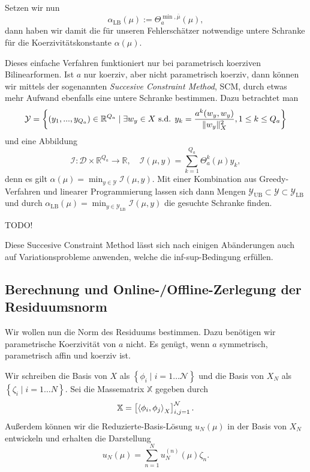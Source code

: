Setzen wir nun
\begin{equation}
    \alpha_\text{LB}(\mu) := \Theta_a^{\min, \bar \mu}(\mu),
\end{equation}
dann haben wir damit die für unseren Fehlerschätzer notwendige untere Schranke für die Koerzivitätskonstante $\alpha(\mu)$.

Dieses einfache Verfahren funktioniert nur bei parametrisch koerziven Bilinearformen. Ist $a$ nur koerziv, aber nicht parametrisch koerziv, dann können wir mittels der sogenannten \emph{Succesive Constraint Method}, SCM, durch etwas mehr Aufwand ebenfalls eine untere Schranke bestimmen. Dazu betrachtet man
\begin{equation}
    \mathcal Y = \left\{ (y_1, ..., y_{Q_a}) \in \mathbb{R}^{Q_a} \mid \exists w_y \in X \text{ s.d. } y_k = \frac{a^k(w_y, w_y)}{\lVert w_y\rVert^2_X}, 1 \leq k \leq Q_a \right\}
\end{equation}
und eine Abbildung
\begin{equation}
    \mathcal I \colon \mathcal D \times \mathbb{R}^{Q_a} \to \mathbb{R}, \quad \mathcal I(\mu, y) = \sum_{k=1}^{Q_a} \Theta^k_a(\mu) y_k,
\end{equation}
 denn es gilt $\alpha(\mu) = \min_{y \in \mathcal Y} \mathcal I(\mu, y)$.
Mit einer Kombination aus Greedy-Verfahren und linearer Programmierung lassen sich dann Mengen $\mathcal Y_\text{UB} \subset \mathcal Y \subset \mathcal Y_\text{LB}$ und durch $\alpha_\text{LB}(\mu) = \min_{y \in \mathcal Y_\text{LB}} \mathcal I(\mu, y)$ die gesuchte Schranke finden.

TODO!

Diese Succesive Constraint Method lässt sich nach einigen Abänderungen auch auf Variationsprobleme anwenden, welche die inf-sup-Bedingung erfüllen.


\subsection{Berechnung und Online-/Offline-Zerlegung der Residuumsnorm} %
\label{sub:online_offline_zerlegung_von_norm}

Wir wollen nun die Norm des Residuums bestimmen.
Dazu benötigen wir parametrische Koerzivität von $a$ nicht.
Es genügt, wenn $a$ symmetrisch, parametrisch affin und koerziv ist.

Wir schreiben die Basis von $X$ als $\left\{ \phi_i \mid i = 1 \ldots \mathcal N \right\}$ und die Basis von $X_N$ als $\left\{ \zeta_i \mid i = 1 \ldots N \right\}$.
Sei die Massematrix $\mathbb{X}$ gegeben durch
\begin{equation}
    \mathbb{X} = \left[ \left\langle\phi_i,\phi_j\right\rangle_X \right]_{i,j=1}^{\mathcal N}.
\end{equation}
Außerdem können wir die Reduzierte-Basis-Lösung $u_N(\mu)$ in der Basis von $X_N$ entwickeln und erhalten die Darstellung
\begin{equation}
    u_N(\mu) = \sum_{n=1}^{N} u_N^{(n)}(\mu) \zeta_n.
\end{equation}

